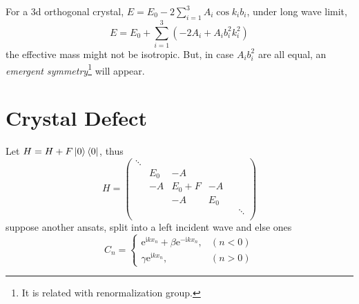 For a $3$d orthogonal crystal, $E = E_0 - 2 \sum_{i=1}^{3} A_i \cos k_i b_i$, under long wave limit,
\begin{equation}
  E = E_0 + \sum_{i=1}^{3} \left( -2 A_i + A_i b_i^{2} k_i^{2} \right) 
\end{equation}
the effective mass might not be isotropic. But, in case $A_i b_i^{2}$ are all equal, an \emph{emergent symmetry}\footnote{It is related with renormalization group.} will appear.

\section[晶格缺陷]{Crystal Defect}
Let $H = H + F \ket{0} \bra{0}$, thus
\begin{equation}
    H = \begin{pmatrix}
        \ddots &  &  &  & \\
         & E_0 & -A &  & \\
         & -A & E_0 + F &-A  & \\
         &  & -A & E_0 & \\
         &  &  &  & &\ddots \\
       \end{pmatrix}
\end{equation}
suppose another ansats, split into a left incident wave and else ones
\begin{equation}
  C_n = \begin{cases} 
    \mathrm{e}^{\mathrm{i} k x_n} + \beta \mathrm{e}^{- \mathrm{i} k x_n}, & (n<0) 
    \\ 
    \gamma \mathrm{e}^{\mathrm{i} k x_n}, & (n>0) 
  \end{cases}
\end{equation}
